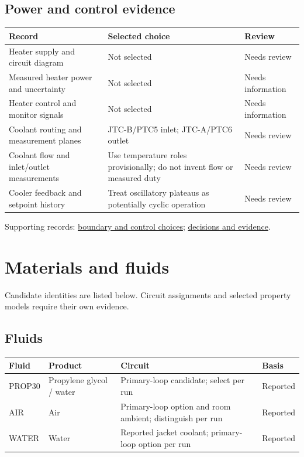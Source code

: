 \documentclass[11pt]{article}
\begin{document}
\subsection*{Power and control evidence}
\small\setlength{\tabcolsep}{4pt}
\begin{longtable}{>{\raggedright\arraybackslash}p{}>{\raggedright\arraybackslash}p{}>{\raggedright\arraybackslash}p{}}
\toprule
\textbf{Record} & \textbf{Selected choice} & \textbf{Review} \\\midrule\endhead
Heater supply and circuit diagram & Not selected & Needs review \\[3pt]
Measured heater power and uncertainty & Not selected & Needs information \\[3pt]
Heater control and monitor signals & Not selected & Needs information \\[3pt]
Coolant routing and measurement planes & JTC-B/PTC5 inlet; JTC-A/PTC6 outlet & Needs review \\[3pt]
Coolant flow and inlet/outlet measurements & Use temperature roles provisionally; do not invent flow or measured duty & Needs review \\[3pt]
Cooler feedback and setpoint history & Treat oscillatory plateaus as potentially cyclic operation & Needs review \\[3pt]
\bottomrule\end{longtable}\normalsize
\vfill{\small Supporting records: \hyperref[model-records]{boundary and control choices}; \hyperref[requirements]{decisions and evidence}.}\par
\clearpage\section{Materials and fluids}\label{materials-main}
Candidate identities are listed below. Circuit assignments and selected property models require their own evidence.
\subsection*{Fluids}
\small\setlength{\tabcolsep}{4pt}
\begin{longtable}{>{\raggedright\arraybackslash}p{}>{\raggedright\arraybackslash}p{}>{\raggedright\arraybackslash}p{}>{\raggedright\arraybackslash}p{}}
\toprule
\textbf{Fluid} & \textbf{Product} & \textbf{Circuit} & \textbf{Basis} \\\midrule\endhead
PROP30 & Propylene glycol / water & Primary-loop candidate; select per run & Reported \\[3pt]
AIR & Air & Primary-loop option and room ambient; distinguish per run & Reported \\[3pt]
WATER & Water & Reported jacket coolant; primary-loop option per run & Reported \\[3pt]
\bottomrule\end{longtable}\normalsize
\end{document}
